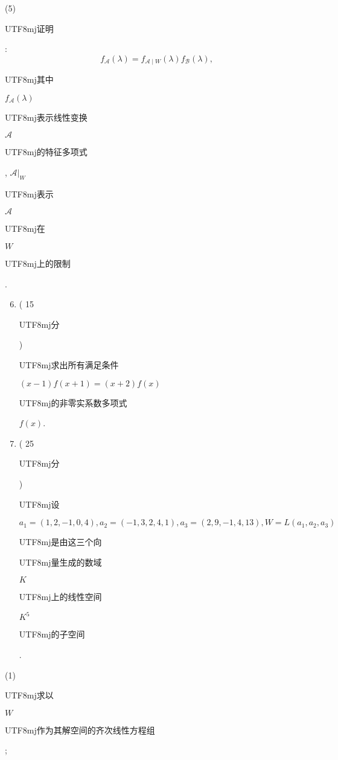 \documentclass[10pt]{article}
\begin{document}
(5) \begin{CJK}{UTF8}{mj}证明\end{CJK}:
$$
f_{\mathcal{A}}(\lambda)=f_{\mathcal{A} \mid W}(\lambda) f_{\mathcal{B}}(\lambda),
$$
\begin{CJK}{UTF8}{mj}其中\end{CJK} $f_{\mathcal{A}}(\lambda)$ \begin{CJK}{UTF8}{mj}表示线性变换\end{CJK} $\mathcal{A}$ \begin{CJK}{UTF8}{mj}的特征多项式\end{CJK}, $\left.\mathcal{A}\right|_{W}$ \begin{CJK}{UTF8}{mj}表示\end{CJK} $\mathcal{A}$ \begin{CJK}{UTF8}{mj}在\end{CJK} $W$ \begin{CJK}{UTF8}{mj}上的限制\end{CJK}.

\begin{enumerate}
  \setcounter{enumi}{5}
  \item ( 15 \begin{CJK}{UTF8}{mj}分\end{CJK}) \begin{CJK}{UTF8}{mj}求出所有满足条件\end{CJK} $(x-1) f(x+1)=(x+2) f(x)$ \begin{CJK}{UTF8}{mj}的非零实系数多项式\end{CJK} $f(x)$.

  \item ( 25 \begin{CJK}{UTF8}{mj}分\end{CJK}) \begin{CJK}{UTF8}{mj}设\end{CJK} $a_{1}=(1,2,-1,0,4), a_{2}=(-1,3,2,4,1), a_{3}=(2,9,-1,4,13), W=L\left(a_{1}, a_{2}, a_{3}\right)$ \begin{CJK}{UTF8}{mj}是由这三个向\end{CJK} \begin{CJK}{UTF8}{mj}量生成的数域\end{CJK} $K$ \begin{CJK}{UTF8}{mj}上的线性空间\end{CJK} $K^{5}$ \begin{CJK}{UTF8}{mj}的子空间\end{CJK}.

\end{enumerate}
(1) \begin{CJK}{UTF8}{mj}求以\end{CJK} $W$ \begin{CJK}{UTF8}{mj}作为其解空间的齐次线性方程组\end{CJK};
\end{document}
